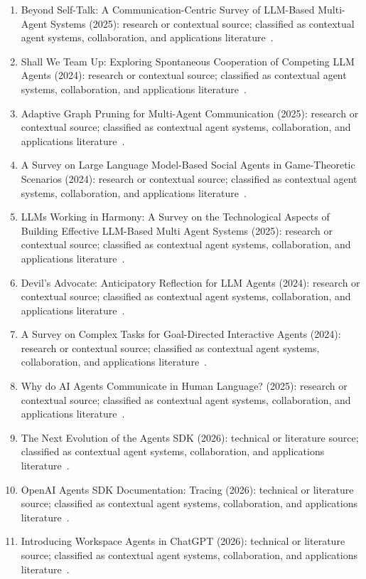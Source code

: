 \begin{enumerate}
\item Beyond Self-Talk: A Communication-Centric Survey of {LLM}-Based Multi-Agent Systems (2025): research or contextual source; classified as contextual agent systems, collaboration, and applications literature~\cite{ext104}.
\item Shall We Team Up: Exploring Spontaneous Cooperation of Competing {LLM} Agents (2024): research or contextual source; classified as contextual agent systems, collaboration, and applications literature~\cite{ext105}.
\item Adaptive Graph Pruning for Multi-Agent Communication (2025): research or contextual source; classified as contextual agent systems, collaboration, and applications literature~\cite{ext108}.
\item A Survey on Large Language Model-Based Social Agents in Game-Theoretic Scenarios (2024): research or contextual source; classified as contextual agent systems, collaboration, and applications literature~\cite{ext109}.
\item {LLM}s Working in Harmony: A Survey on the Technological Aspects of Building Effective {LLM}-Based Multi Agent Systems (2025): research or contextual source; classified as contextual agent systems, collaboration, and applications literature~\cite{ext110}.
\item Devil's Advocate: Anticipatory Reflection for {LLM} Agents (2024): research or contextual source; classified as contextual agent systems, collaboration, and applications literature~\cite{ext111}.
\item A Survey on Complex Tasks for Goal-Directed Interactive Agents (2024): research or contextual source; classified as contextual agent systems, collaboration, and applications literature~\cite{ext112}.
\item Why do {AI} Agents Communicate in Human Language? (2025): research or contextual source; classified as contextual agent systems, collaboration, and applications literature~\cite{ext115}.
\item The Next Evolution of the {Agents SDK} (2026): technical or literature source; classified as contextual agent systems, collaboration, and applications literature~\cite{ext116}.
\item {OpenAI Agents SDK} Documentation: Tracing (2026): technical or literature source; classified as contextual agent systems, collaboration, and applications literature~\cite{ext117}.
\item Introducing Workspace Agents in {ChatGPT} (2026): technical or literature source; classified as contextual agent systems, collaboration, and applications literature~\cite{ext119}.

\end{enumerate}
